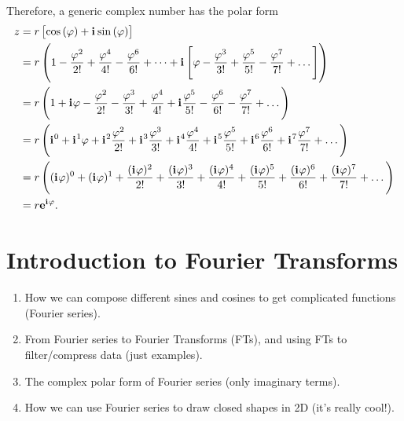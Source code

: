 \documentclass{article}
\newcommand{\iu}{\mathbf{i}\mkern1mu}
\newcommand{\Eu}[1]{\mathbf{e}^{#1}}
\newcommand{\zpolar}[2]{#1\left[\cos\left(#2\right)+\iu\sin\left(#2\right)\right]}
\begin{document}
Therefore, a generic complex number has the polar form
\begin{equation}
	\begin{aligned}
		z & = \zpolar{r}{\varphi}                                                                                                                                                                                                                   \\
		  & = r \left(1 - \frac{\varphi^2}{2!} + \frac{\varphi^4}{4!} - \frac{\varphi^6}{6!} + \dots + \iu\left[\varphi-\frac{\varphi^3}{3!}+\frac{\varphi^5}{5!} - \frac{\varphi^7}{7!} + \dots\right] \right)                                     \\
		  & = r\left(1 + \iu \varphi - \frac{\varphi^2}{2!} - \frac{\varphi^3}{3!} + \frac{\varphi^4}{4!} + \iu\frac{\varphi^5}{5!} - \frac{\varphi^6}{6!} - \frac{\varphi^7}{7!} + \dots \right)                                                   \\
		  & = r\left(\iu^0 + \iu^1 \varphi + \iu^2 \frac{\varphi^2}{2!} + \iu^3 \frac{\varphi^3}{3!} + \iu^4 \frac{\varphi^4}{4!} + \iu^5 \frac{\varphi^5}{5!} + \iu^6 \frac{\varphi^6}{6!} + \iu^7 \frac{\varphi^7}{7!} + \dots \right)            \\
		  & = r\left((\iu \varphi)^0 + (\iu \varphi)^1 + \frac{(\iu \varphi)^2}{2!} + \frac{(\iu \varphi)^3}{3!} + \frac{(\iu \varphi)^4}{4!} + \frac{(\iu \varphi)^5}{5!} + \frac{(\iu \varphi)^6}{6!} + \frac{(\iu \varphi)^7}{7!} + \dots\right) \\
		  & = r\Eu{\iu \varphi}.
	\end{aligned}
	\label{eq:eulers_formula}
\end{equation}


\section{Introduction to Fourier Transforms}
\begin{enumerate}
	\item How we can compose different sines and cosines to get complicated functions (Fourier series).
	\item From Fourier series to Fourier Transforms (FTs), and using FTs to filter/compress data (just examples).
	\item The complex polar form of Fourier series (only imaginary terms).
	\item How we can use Fourier series to draw closed shapes in 2D (it's really cool!).
\end{enumerate}
\end{document}
